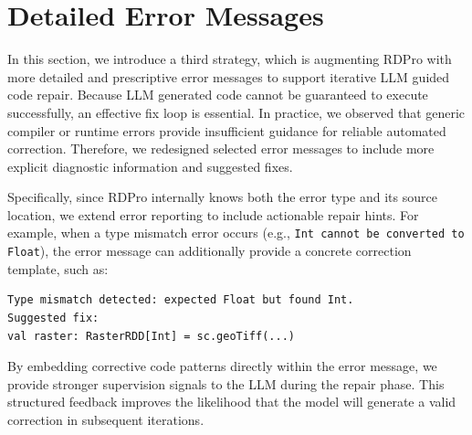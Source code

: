 \section{Detailed Error Messages}
In this section, we introduce a third strategy, which is augmenting RDPro with more detailed and prescriptive error messages to support iterative LLM guided code repair. Because LLM generated code cannot be guaranteed to execute successfully, an effective fix loop is essential. In practice, we observed that generic compiler or runtime errors provide insufficient guidance for reliable automated correction. Therefore, we redesigned selected error messages to include more explicit diagnostic information and suggested fixes.

Specifically, since RDPro internally knows both the error type and its source location, we extend error reporting to include actionable repair hints. For example, when a type mismatch error occurs (e.g., \texttt{Int cannot be converted to Float}), the error message can additionally provide a concrete correction template, such as:
\begin{verbatim}
Type mismatch detected: expected Float but found Int.
Suggested fix:
val raster: RasterRDD[Int] = sc.geoTiff(...)
\end{verbatim}
By embedding corrective code patterns directly within the error message, we provide stronger supervision signals to the LLM during the repair phase. This structured feedback improves the likelihood that the model will generate a valid correction in subsequent iterations. 